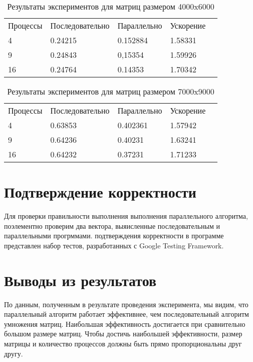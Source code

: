 \documentclass{report}
\begin{document}
\begin{table}[!h]
\caption{Результаты экспериментов для матриц размером 4000x6000}
\centering
\begin{tabular}{lllll}
Процессы & Последовательно & Параллельно & Ускорение  \\
4        & 0.24215     & 0.152884   & 1.58331        \\
9        & 0.24843      & 0,15354   & 1.59926      \\
16       & 0.24764      & 0.14353   & 1.70342      
\end{tabular}

\end{table}
\begin{table}[!h]
\caption{Результаты экспериментов для матриц размером 7000x9000}
\centering
\begin{tabular}{lllll}
Процессы & Последовательно & Параллельно & Ускорение  \\
4        & 0.63853      & 0.402361   & 1.57942   \\
9        & 0.64236     & 0.40231   & 1.63241       \\
16       & 0.64232      & 0.37231   & 1.71233      
\end{tabular}
\end{table}

\newpage

\section*{Подтверждение корректности}
Для проверки правильности выполнения выполнения параллельного алгоритма, поэлементно проверим два вектора, выяисленные последовательным и параллельными прогрммами.
 подтверждения корректности в программе представлен набор тестов, разработанных с Google Testing Framework.
\newpage

\section*{Выводы из результатов}
\par По данным, полученным в результате проведения эксперимента, мы видим, что параллельный алгоритм работает эффективнее, чем последовательный алгоритм умножения матриц. Наибольшая эффективность достигается при
сравнительно большом размере матриц. Чтобы достичь наибольшей эффективности, размер матрицы и количество процессов должны быть прямо пропорциональны друг другу.
\newpage
\end{document}
